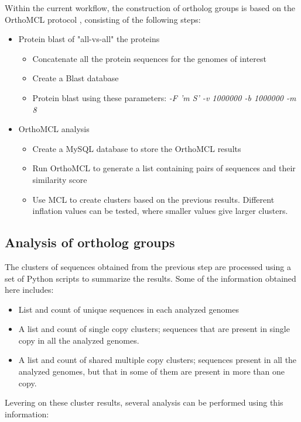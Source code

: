 Within the current workflow, the construction of ortholog groups is based on the OrthoMCL protocol \cite{Li:2003en}, consisting of the following steps: 
\begin{itemize}
\item Protein blast of "all-vs-all" the proteins
	\begin{itemize}
	\item Concatenate all the protein sequences for the genomes of interest
	\item Create a Blast database
	\item Protein blast using these parameters: \textit{-F 'm S' -v 1000000 -b 1000000 -m 8}
	\end{itemize}
\item OrthoMCL analysis
	\begin{itemize}
	\item Create a MySQL database to store the OrthoMCL results
	\item Run OrthoMCL to generate a list containing pairs of sequences and their similarity score
	\item Use MCL to create clusters based on the previous results. Different inflation values can be tested, where smaller values give larger clusters.
	\end{itemize}
\end{itemize}

\subsection{Analysis of ortholog groups}

The clusters of sequences obtained from the previous step are processed using a set of Python scripts to summarize the results. Some of the information obtained here includes:

\begin{itemize}
\item List and count of unique sequences in each analyzed genomes
\item A list and count of single copy clusters; sequences that are present in single copy in all the analyzed genomes. 
\item A list and count of shared multiple copy clusters; sequences present in all the analyzed genomes, but that in some of them are present in more than one copy.
\end{itemize} 

Levering on these cluster results, several analysis can be performed using this information:

